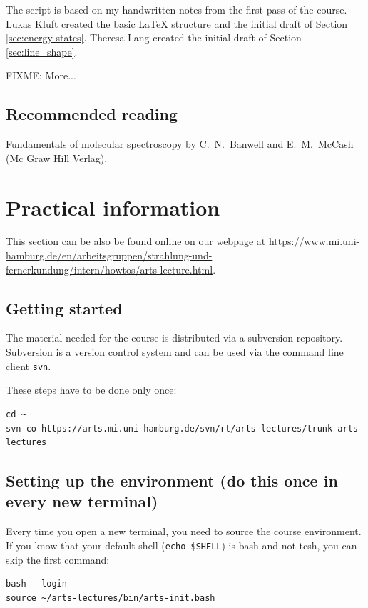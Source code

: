 The script is based on my handwritten notes from the first pass of the
course.  Lukas Kluft created the basic LaTeX structure and the initial
draft of Section \ref{sec:energy-states}. Theresa Lang created the
initial draft of Section \ref{sec:line_shape}.

FIXME: More...

\subsection*{Recommended reading}

Fundamentals of molecular spectroscopy by C.\ N.\
Banwell and E.\ M.\ McCash (Mc Graw Hill Verlag).


\section{Practical information}

This section can be also be found online on our webpage at
\url{https://www.mi.uni-hamburg.de/en/arbeitsgruppen/strahlung-und-fernerkundung/intern/howtos/arts-lecture.html}.

\subsection*{Getting started}

The material needed for the course is distributed via a subversion repository.
Subversion is a version control system and can be used via the command line
client \verb|svn|.

These steps have to be done only once:

\begin{verbatim}
cd ~
svn co https://arts.mi.uni-hamburg.de/svn/rt/arts-lectures/trunk arts-lectures
\end{verbatim}

\subsection*{Setting up the environment
(do this once in every new terminal)}
\label{sec:setup-env}


Every time you open a new terminal, you need to source the course environment.
If you know that your default shell (\verb|echo $SHELL|) is bash and not tcsh,
you can skip the first command:

\begin{verbatim}
bash --login
source ~/arts-lectures/bin/arts-init.bash
\end{verbatim}

